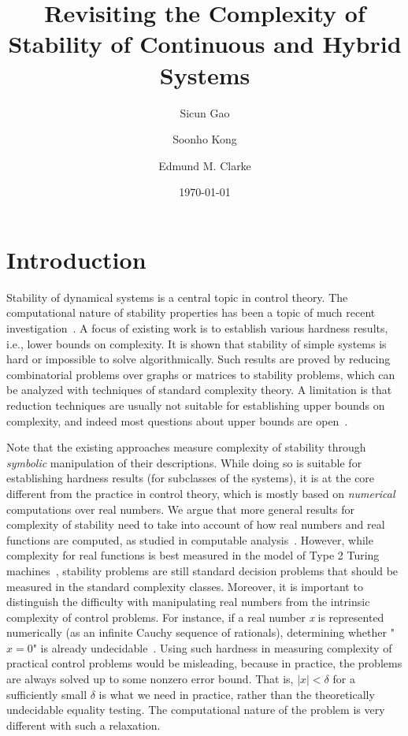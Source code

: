 \documentclass[12pt]{article}
\title{\LARGE \bf Revisiting the Complexity of Stability of Continuous and Hybrid Systems}
\author{Sicun Gao \and Soonho Kong \and Edmund M. Clarke}
\date{\today}
\theoremstyle{plain}
\theoremstyle{definition}
\begin{document}
\maketitle

\section{Introduction}

Stability of dynamical systems is a central topic in control theory. The computational nature of stability properties has been a topic of much recent investigation~\cite{DBLP:journals/corr/AhmadiP13,DBLP:journals/automatica/BlondelT99,DBLP:journals/automatica/BlondelT00,AAAthesis,DBLP:conf/hybrid/PrabhakarV13,DBLP:journals/corr/abs-1210-7420}. A focus of existing work is to establish various hardness results, i.e., lower bounds on complexity. It is shown that stability of simple systems is hard or impossible to solve algorithmically. Such results are proved by reducing combinatorial problems over graphs or matrices to stability problems, which can be analyzed with techniques of standard complexity theory. A limitation is that reduction techniques are usually not suitable for establishing upper bounds on complexity, and indeed most questions about upper bounds are open~\cite{AAAthesis}.

Note that the existing approaches measure complexity of stability through {\em symbolic} manipulation of their descriptions. While doing so is suitable for establishing hardness results (for subclasses of the systems), it is at the core different from the practice in control theory, which is mostly based on {\em numerical} computations over real numbers. We argue that more general results for complexity of stability need to take into account of how real numbers and real functions are computed, as studied in computable analysis~\cite{CAbook,Kobook,16557}. However, while complexity for real functions is best measured in the model of Type 2 Turing machines~\cite{Kobook}, stability problems are still standard decision problems that should be measured in the standard complexity classes. Moreover, it is important to distinguish the difficulty with manipulating real numbers from the intrinsic complexity of control problems. For instance, if a real number {\em x} is represented numerically (as an infinite Cauchy sequence of rationals), determining whether "$x=0$" is already undecidable~\cite{CAbook}. Using such hardness in measuring complexity of practical control problems would be misleading, because in practice, the problems are always solved up to some nonzero error bound. That is, $|x|<\delta$ for a sufficiently small $\delta$ is what we need in practice, rather than the theoretically undecidable equality testing. The computational nature of the problem is very different with such a relaxation.
\end{document}
